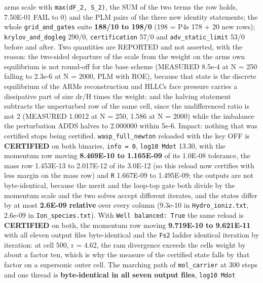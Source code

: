 \documentclass[english,a4paper]{my_memo}
\begin{document}
\begin{itemize}
  arm\textquotesingle s scale with \texttt{max(\textbar{}dF\_2\textbar{},\ \textbar{}S\_2\textbar{})}, the SUM of the two terms the row
  holds, 7.50E-01 FAIL to 0) and the PLM pairs of the three new identity
  statements; the whole \texttt{grid\_and\_gates} suite \textbf{188/10 to 198/0} (198 =
  P4\textquotesingle s 178 + 20 new rows); \texttt{krylov\_and\_dogleg} 290/0, \texttt{certification} 57/0 and
  \texttt{adv\_static\_limit} 53/0 before and after. Two quantities are REPORTED and
  not asserted, with the reason: the two-sided departure of the scale from the
  weight on the arm\textquotesingle s own equilibrium is not round-off for the base scheme
  (MEASURED 8.5e-4 at N = 250 falling to 2.3e-6 at N = 2000, PLM with ROE),
  because that state is the discrete equilibrium of the ARM\textquotesingle s reconstruction
  and HLLC\textquotesingle s face pressure carries a dissipative part of size dr/H times the
  weight; and the halving statement subtracts the unperturbed row of the same
  cell, since the undifferenced ratio is not 2 (MEASURED 1.0012 at N = 250,
  1.586 at N = 2000) while the imbalance the perturbation ADDS halves to
  2.000000 within 5e-6. Impact: nothing that was certified stops being
  certified. \texttt{wasp\_full\_newton} reloaded with the key OFF is \textbf{CERTIFIED} on
  both binaries, \texttt{info\ =\ 0}, \texttt{log10\ Mdot} 13.30, with the momentum row moving
  \textbf{8.469E-10 to 1.165E-09} of its 1.0E-08 tolerance, the mass row 1.453E-13
  to 2.017E-12 of its 3.0E-12 (so this reload now certifies with less margin
  on the mass row) and \texttt{\textbar{}\textbar{}R\textbar{}\textbar{}} 1.667E-09 to 1.495E-09; the outputs are not
  byte-identical, because the merit and the loop-top gate both divide by the
  momentum scale and the two solves accept different iterates, and the states
  differ by at most \textbf{2.6E-09 relative} over every column (9.3e-10 in
  \texttt{Hydro\_ioniz.txt}, 2.6e-09 in \texttt{Ion\_species.txt}). With \texttt{Well\ balanced:\ True} the same reload is \textbf{CERTIFIED} on both, the momentum row moving
  \textbf{9.719E-10 to 9.621E-11} with all eleven output files byte-identical and
  the \texttt{\textbar{}\textbar{}Fs\textbar{}\textbar{}2} ladder identical iteration by iteration: at cell 500,
  r = 4.62, the ram divergence exceeds the cell\textquotesingle s weight by about a factor
  ten, which is why the measure of the certified state falls by that factor on
  a supersonic outer cell. The marching path of \texttt{mol\_carrier} at 300 steps and
  one thread is \textbf{byte-identical in all seven output files}, \texttt{log10\ Mdot}

\end{itemize}
\end{document}
